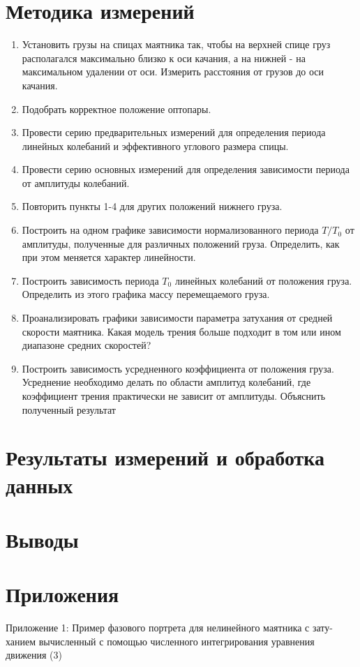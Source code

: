 \documentclass[a4paper]{article}
\begin{document}
\section{Методика измерений}
\begin{enumerate}
\item Установить грузы на спицах маятника так, чтобы на верхней спице груз располагался максимально близко к оси качания, а на нижней - на максимальном удалении от оси. Измерить расстояния от грузов до оси качания.
\item Подобрать корректное положение оптопары. 
\item Провести серию предварительных измерений для определения периода линейных колебаний и эффективного углового размера спицы.
\item Провести серию основных измерений для определения зависимости периода от амплитуды колебаний.
\item Повторить пункты 1-4 для других положений нижнего груза.
\item Построить на одном графике зависимости нормализованного периода $T/T_0$ от амплитуды, полученные для различных положений груза. Определить, как при этом меняется характер линейности.
\item Построить зависимость периода $T_0$ линейных колебаний от положения груза. Определить из этого графика массу перемещаемого груза.
\item Проанализировать графики зависимости параметра затухания от средней скорости маятника. Какая модель трения больше подходит в том или ином диапазоне средних скоростей?
\item Построить зависимость усредненного коэффициента от положения груза. Усреднение необходимо делать по области амплитуд колебаний, где коэффициент трения практически не зависит от амплитуды. Объяснить полученный результат
\end{enumerate}
\section{Результаты измерений и обработка данных}

\section{Выводы}


\section{Приложения}
Приложение 1: Пример фазового портрета для нелинейного маятника с зату-
ханием вычисленный с помощью численного интегрирования уравнения
движения (3)
\end{document}
